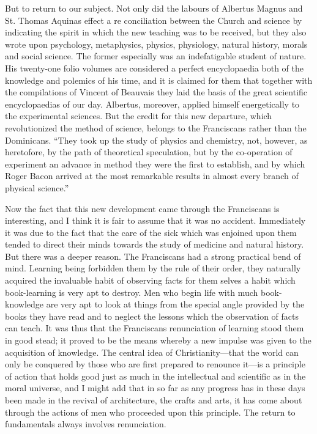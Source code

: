 \documentclass{book}
\begin{document}
But to return to our subject. Not only did the labours of Albertus Magnus and St. Thomas Aquinas effect a re conciliation between the Church and science by indicating the spirit in which the new teaching was to be received, but they also wrote upon psychology, metaphysics, physics, physiology, natural history, morals and social science. The former especially was an indefatigable student of nature. His twenty-one folio volumes are considered a perfect encyclopaedia both of the knowledge and polemics of his time, and it is claimed for them that together with the compilations of Vincent of Beauvais they laid the basis of the great scientific encyclopaedias of our day. Albertus, moreover, applied himself energetically to the experimental sciences. But the credit for this new departure, which revolutionized the method of science, belongs to the Franciscans rather than the Dominicans. “They took up the study of physics and chemistry, not, however, as heretofore, by the path of theoretical speculation, but by the co-operation of experiment an advance in method they were the first to establish, and by which Roger Bacon arrived at the most remarkable results in almost every branch of physical science.”\footnotemark[7]

Now the fact that this new development came through the Franciscans is interesting, and I think it is fair to assume that it was no accident. Immediately it was due to the fact that the care of the sick which was enjoined upon them tended to direct their minds towards the study of medicine and natural history. But there was a deeper reason. The Franciscans had a strong practical bend of mind. Learning being forbidden them by the rule of their order, they naturally acquired the invaluable habit of observing facts for them selves a habit which book-learning is very apt to destroy. Men who begin life with much book-knowledge are very apt to look at things from the special angle provided by the books they have read and to neglect the lessons which the observation of facts can teach. It was thus that the Franciscans renunciation of learning stood them in good stead; it proved to be the means whereby a new impulse was given to the acquisition of knowledge. The central idea of Christianity—that the world can only be conquered by those who are first prepared to renounce it—is a principle of action that holds good just as much in the intellectual and scientific as in the moral universe, and I might add that in so far as any progress has in these days been made in the revival of architecture, the crafts and arts, it has come about through the actions of men who proceeded upon this principle. The return to fundamentals always involves renunciation.
\end{document}
